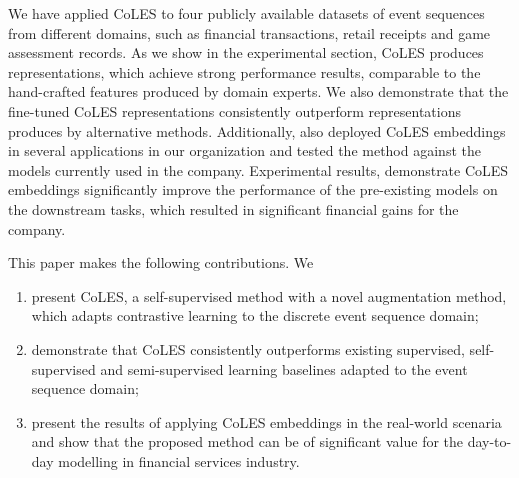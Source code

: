 \documentclass[sigconf, anonymous]{acmart}
\begin{document}
We have applied CoLES to four publicly available datasets of event sequences from different
domains, such as financial transactions, retail receipts and game assessment records. As we
show in the experimental section, CoLES produces representations, which achieve strong
performance results, comparable to the hand-crafted features produced by domain experts.
We also demonstrate that the fine-tuned CoLES representations consistently outperform
representations produces by alternative methods.
%
%
Additionally, also deployed CoLES embeddings in several applications in our organization and tested
the method against the models currently used in the company. Experimental results, demonstrate
CoLES embeddings significantly improve the performance of the pre-existing models on the downstream
tasks, which resulted in significant financial gains for the company.


This paper makes the following contributions. We
\begin{enumerate}
    \item present CoLES, a self-supervised method with a novel augmentation method, which adapts
    contrastive learning to the discrete event sequence domain;

    \item demonstrate that CoLES consistently outperforms existing supervised, self-supervised and
    semi-supervised learning baselines adapted to the event sequence domain;

    \item present the results of applying CoLES embeddings in the real-world scenaria and show
    that the proposed method can be of significant value for the day-to-day modelling in financial
    services industry.
\end{enumerate}
\end{document}
